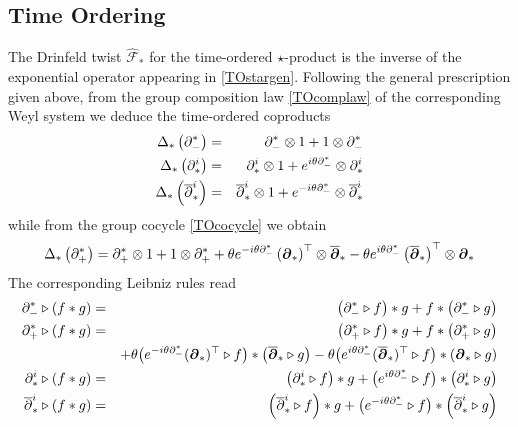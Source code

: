 \subsection{Time Ordering}
\label{TOcoprod}
The Drinfeld twist $\hat{\mathcal F}_*$ for the time-ordered $\star$-product is
the inverse of the exponential operator appearing in \eqref{TOstargen}.
Following the general prescription given above, from the group composition law
\eqref{TOcomplaw} of the corresponding Weyl system we deduce the time-ordered
coproducts
\begin{eqnarray}
  \label{TOcoprods}
  \Delta_*\left(\partial_-^*\right)&=&\partial_-^*\otimes1+
1\otimes\partial_-^* \\\nonumber
\Delta_*\left(\partial^i_*\right)&=&\partial^i_*\otimes1+
 e^{ i\theta \partial_-^*}\otimes\partial^i_* \\\nonumber
\Delta_*\left( \overline{\partial}^{ i}_*\right)&=&
\overline{\partial}^{ i}_*\otimes1+ e^{- i\theta \partial_-^*}
\otimes\overline{\partial}^{ i}_*
\end{eqnarray}
while from the group cocycle \eqref{TOcocycle} we obtain
\begin{equation}
  \label{TOcoprodtime}
  \Delta_*\left(\partial_+^*\right)=\partial_+^*\otimes1+
1\otimes\partial_+^*+\theta  e^{- i\theta 
\partial_-^*} \left({{\boldsymbol {\partial} }}_*\right)^\top\otimes\overline{{{\boldsymbol {\partial} }}}_*-\theta 
 e^{ i\theta \partial_-^*} 
\left( \overline{{{\boldsymbol {\partial} }}}_*\right)^\top\otimes{{\boldsymbol {\partial} }}_*
\end{equation}
The corresponding Leibniz rules read
\begin{eqnarray}
  \label{TOLeibniz}
  \partial_-^*\triangleright(f*g)&=&\left(\partial_-^*\triangleright
f\right)*g+f*\left(\partial_-^*\triangleright g\right) \\\nonumber
\partial_+^*\triangleright(f*g)&=&\left(\partial_+^*\triangleright
f\right)*g+f*\left(\partial_+^*\triangleright g\right)\\\nonumber &&
+ \theta \bigl( e^{- i\theta \partial_-^*} ({{\boldsymbol {\partial} }}_*)^\top
\triangleright f\bigr) * \left( \overline{{{\boldsymbol {\partial} }}}_*
\triangleright g\right)-\theta \bigl( e^{ i\theta \partial_-^*} 
(\overline{{{\boldsymbol {\partial} }}}_*)^\top
\triangleright f\bigr) * \left({{\boldsymbol {\partial} }}_*\triangleright g\right)
\\\nonumber \partial^i_*\triangleright(f*g)&=&\left(\partial^i_*
\triangleright f\right)*g+\bigl( e^{ i\theta \partial_-^*}
\triangleright f\bigr)*\left(\partial^i_*\triangleright g\right)
\\\nonumber \overline{\partial}^{ i}_*
\triangleright(f*g)&=&\left( \overline{\partial}^{ i}_*
\triangleright f\right)*g+\bigl( e^{- i\theta \partial_-^*}
\triangleright f\bigr)*\left( \overline{\partial}^{ i}_*
\triangleright g\right)
\end{eqnarray}

